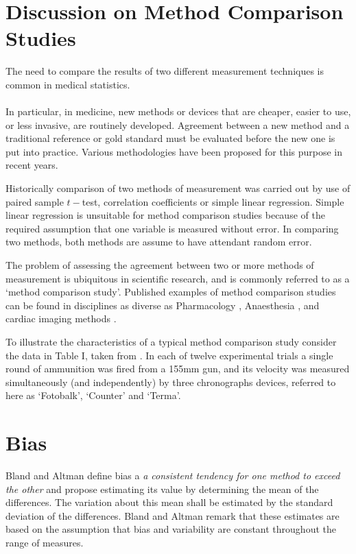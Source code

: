 \documentclass[12pt, a4paper]{report}
\theoremstyle{plain}
\theoremstyle{definition}
\theoremstyle{remark}
\begin{document}
	


	
	
	

	\section{Discussion on Method Comparison Studies}
	
	The need to compare the results of two different measurement
	techniques is common in medical statistics.
	\\
	\\
	In particular, in medicine, new methods or devices that are
	cheaper, easier to use, or less invasive, are routinely developed.
	Agreement between a new method and a traditional reference or gold
	standard must be evaluated before the new one is put into
	practice. Various methodologies have been proposed for this
	purpose in recent years.
	

	Historically comparison of two methods of measurement was carried
	out by use of paired sample $t-$test, correlation coefficients or
	simple linear regression. Simple linear regression is unsuitable for method comparison studies because of the required assumption that one variable is measured without error. In comparing two methods, both methods are assume to have attendant random error.
	



	The problem of assessing the agreement between two or more methods
	of measurement is ubiquitous in scientific research, and is
	commonly referred to as a `method comparison study'. Published
	examples of method comparison studies can be found in disciplines
	as diverse as Pharmacology \citep{ludbrook97}, Anaesthesia
	\citep{Myles}, and cardiac imaging methods \citep{Krumm}.
	\smallskip
	
	To illustrate the characteristics of a typical method comparison
	study consider the data in Table I, taken from \citet{Grubbs73}.
	In each of twelve experimental trials a single round of ammunition
	was fired from a 155mm gun, and its velocity was measured
	simultaneously (and independently) by three chronographs devices,
	referred to here as `Fotobalk', `Counter' and `Terma'.
	\smallskip
	
	
	
	
	\section{Bias}
	Bland and Altman define bias a \emph{a consistent tendency for one
		method to exceed the other} and propose estimating its value
	by determining the mean of the differences. The variation about
	this mean shall be estimated by the  standard deviation of the
	differences. Bland and Altman remark that these estimates are based on the
	assumption that bias and variability are constant throughout the
	range of measures.
	
\end{document}
